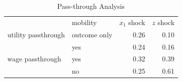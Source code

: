 \documentclass{article}
\begin{document}
\begin{table}[htpb]
    \caption{Pass-through Analysis}
    \label{tab:pass_through}
    \centering
    \begin{tabular}{l l r r} 
        \toprule 
         & mobility & $x_1$ shock & $z$ shock\\
         \cmidrule(lr){2-4}
        utility passthrough & outcome only & 0.26 & 0.10\\
         & yes & 0.24 & 0.16\\
        wage passthrough & yes & 0.32 & 0.39\\
         & no & 0.25 & 0.61\\
        \bottomrule 
        \end{tabular}        
\end{table}
\end{document}
